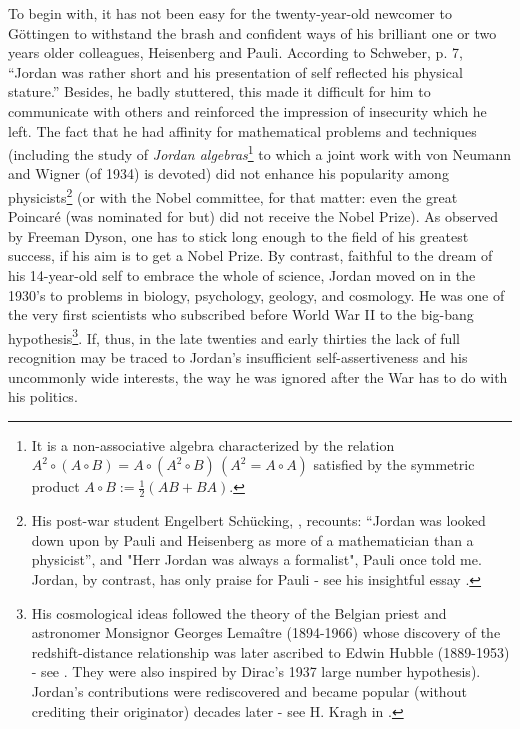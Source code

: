 To begin with, it has not been easy for the twenty-year-old newcomer to G\"ottingen to withstand
the brash and confident ways of his brilliant one or two years older colleagues, Heisenberg and Pauli.
According to Schweber, \cite{Sch} p. 7, ``Jordan was rather short and his presentation of self
reflected his physical stature.'' Besides, he badly stuttered, this made it difficult for him to
communicate with others and reinforced the impression of insecurity which he left. The fact that he
had affinity for mathematical problems and techniques (including the study of {\it Jordan algebras}\footnote{It is a non-associative 
algebra characterized by the relation $A^2\circ(A\circ B) = A\circ(A^2\circ B) \, (A^2 = A\circ A)$ satisfied by the symmetric 
product $A\circ B := \frac{1}{2}(A B + B A)$.} to which a joint work with von Neumann and Wigner \cite{JNW} (of 1934) is devoted) 
did not enhance his popularity among physicists\footnote{His post-war student Engelbert Sch\"ucking, \cite{Sch99}, 
recounts: ``Jordan was looked down upon  by Pauli and Heisenberg as more of a mathematician than 
a physicist'', and "Herr Jordan was always a formalist", Pauli once told me. Jordan, by contrast,
has only praise for Pauli - see his insightful essay \cite{J}.} (or with the Nobel committee, for 
that matter: even the great Poincar\'e (was nominated for but) did not receive the Nobel Prize). 
As observed by Freeman Dyson, one has to stick long enough to the field of his greatest success, 
if his aim is to get a Nobel Prize. By contrast, faithful to the dream of his 14-year-old self
to embrace the whole of science, Jordan moved on in the 1930's to problems in biology,
psychology, geology, and cosmology. He was one of the very first scientists who subscribed
before World War II to the big-bang hypothesis\footnote{His cosmological ideas followed the theory of
the Belgian priest and astronomer Monsignor Georges Lema\^itre (1894-1966) whose discovery of the redshift-distance
relationship was later ascribed to Edwin Hubble (1889-1953) - see \cite{WN}. They were also inspired by Dirac's 1937
large number hypothesis). Jordan's contributions were rediscovered and became popular (without crediting their
originator) decades later - see H. Kragh in \cite{PJ07}.}. If, thus, in the late twenties and early
thirties the lack of full recognition may be traced to Jordan's insufficient self-assertiveness and
his uncommonly wide interests, the way he was ignored after the War has to do with his politics.


